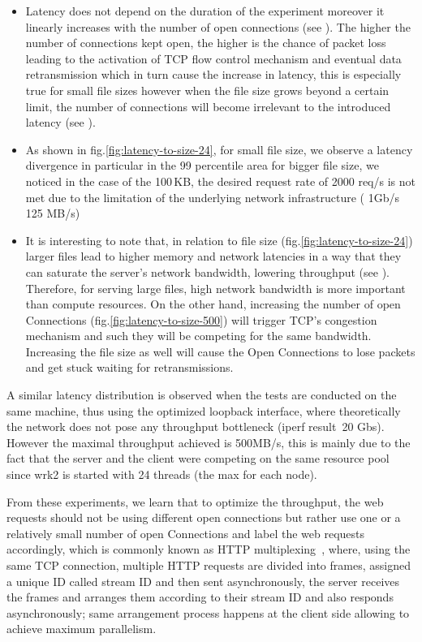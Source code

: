 \documentclass[runningheads]{llncs}
\begin{document}
\begin{itemize}
  \item Latency does not depend on the duration of the experiment moreover it linearly increases with the number of open connections (see  ). The higher the number of connections kept open, the higher is the chance of packet loss leading to the activation of TCP flow control mechanism and eventual data retransmission which in turn cause the increase in latency, this is especially true for small file sizes however when the file size grows beyond a certain limit, the number of connections will become irrelevant to the introduced latency (see ). 
  \item As shown in fig.\ref{fig:latency-to-size-24}, for small file size, we observe a latency divergence in particular in the 99 percentile area
for bigger file size, we noticed in the case of the 100\,KB, the desired request rate of 2000 req/s is not met due to the limitation of the underlying network infrastructure ( 1Gb/s ~ 125 MB/s)
  \item It is interesting to note that, in relation to file size (fig.\ref{fig:latency-to-size-24}) larger files lead to higher memory and network latencies in a way that they can saturate the server’s network bandwidth, lowering throughput (see ). Therefore,  for  serving  large files,  high  network  bandwidth  is  more  important  than compute resources. On the other hand, increasing the number of open Connections (fig.\ref{fig:latency-to-size-500}) will trigger TCP's congestion mechanism and such they will be competing for the same bandwidth. Increasing the file size as well will cause the Open Connections to lose packets and get stuck waiting for retransmissions.
\end{itemize}
A similar latency distribution is observed when the tests are conducted on the same machine, thus using the optimized\cite{linuxkernelcommit} loopback interface, where theoretically the network does not pose any throughput bottleneck (iperf \cite{iperf} result~20 Gbs). However the maximal throughput achieved is 500MB/s, this is mainly due to the fact that the server and the client were competing on the same resource pool since wrk2 is started with 24 threads (the max for each node).

From these experiments, we learn that to optimize the throughput, the web requests should not be using different open connections but rather use one or a relatively small number of open Connections and label the web requests accordingly, which is commonly known as HTTP multiplexing \,\cite{SMUX}, where, using the same TCP connection, multiple HTTP requests are divided into frames, assigned a unique ID called stream ID and then sent asynchronously, the server receives the frames and arranges them according to their stream ID and also responds asynchronously; same arrangement process happens at the client side allowing to achieve maximum parallelism.
\end{document}
